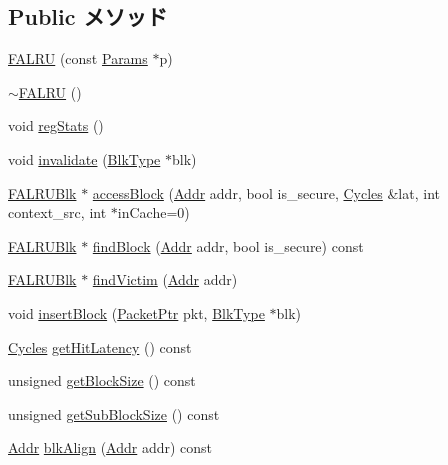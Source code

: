 \subsection*{Public メソッド}
\begin{DoxyCompactItemize}
\item 
\hyperlink{classFALRU_a008e99fdba3bde11cbd17bbc553a58f5}{FALRU} (const \hyperlink{classFALRU_ac02f095611cbe1cc1b0d89ce95694168}{Params} $\ast$p)
\item 
\hyperlink{classFALRU_a642d32a0be0130f14545c0d7c2cf71a1}{$\sim$FALRU} ()
\item 
void \hyperlink{classFALRU_a4dc637449366fcdfc4e764cdf12d9b11}{regStats} ()
\item 
void \hyperlink{classFALRU_a11ea27715371eaeb125996e0a9ce14ab}{invalidate} (\hyperlink{classFALRUBlk}{BlkType} $\ast$blk)
\item 
\hyperlink{classFALRUBlk}{FALRUBlk} $\ast$ \hyperlink{classFALRU_a1cdfe87d1268e092f50485fd168e30ba}{accessBlock} (\hyperlink{base_2types_8hh_af1bb03d6a4ee096394a6749f0a169232}{Addr} addr, bool is\_\-secure, \hyperlink{classCycles}{Cycles} \&lat, int context\_\-src, int $\ast$inCache=0)
\item 
\hyperlink{classFALRUBlk}{FALRUBlk} $\ast$ \hyperlink{classFALRU_ac33a8d39699e8ad6ba542fe00377e99f}{findBlock} (\hyperlink{base_2types_8hh_af1bb03d6a4ee096394a6749f0a169232}{Addr} addr, bool is\_\-secure) const 
\item 
\hyperlink{classFALRUBlk}{FALRUBlk} $\ast$ \hyperlink{classFALRU_aa576cf2f9fcd41bff96e7a930ae24849}{findVictim} (\hyperlink{base_2types_8hh_af1bb03d6a4ee096394a6749f0a169232}{Addr} addr)
\item 
void \hyperlink{classFALRU_a79eef32acfa26685ba4a2f8e89f3f949}{insertBlock} (\hyperlink{classPacket}{PacketPtr} pkt, \hyperlink{classFALRUBlk}{BlkType} $\ast$blk)
\item 
\hyperlink{classCycles}{Cycles} \hyperlink{classFALRU_a0239f3ef0ba6cf7c0460b12d289e6517}{getHitLatency} () const 
\item 
unsigned \hyperlink{classFALRU_a38301abe4b3689f8ac7de5c13a046234}{getBlockSize} () const 
\item 
unsigned \hyperlink{classFALRU_aca3769c95ef908ce22475a69f8929a32}{getSubBlockSize} () const 
\item 
\hyperlink{base_2types_8hh_af1bb03d6a4ee096394a6749f0a169232}{Addr} \hyperlink{classFALRU_a73119e914b3b83f88be5bde312855cfe}{blkAlign} (\hyperlink{base_2types_8hh_af1bb03d6a4ee096394a6749f0a169232}{Addr} addr) const 
\item 

\end{DoxyCompactItemize}
